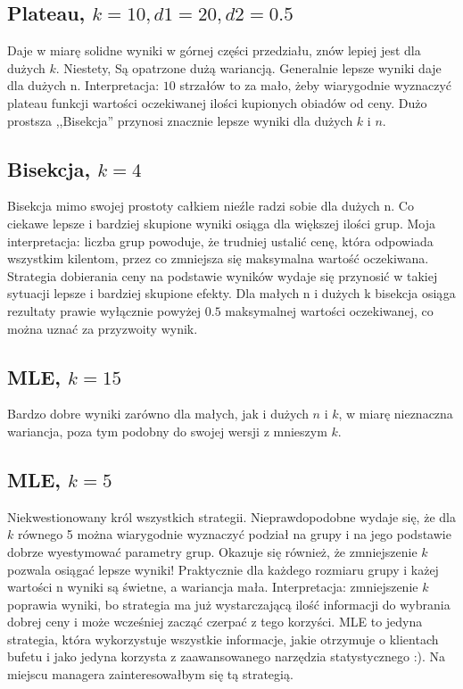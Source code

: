 \documentclass[a4paper,11pt]{article}
\begin{document}
\subsection{Plateau, $k=10, d1=20, d2=0.5$}
Daje w miarę solidne wyniki w górnej części przedziału, znów lepiej jest dla dużych $k$.
Niestety, Są opatrzone dużą wariancją. Generalnie lepsze wyniki daje dla dużych n.
Interpretacja: $10$ strzałów to za mało, żeby wiarygodnie wyznaczyć plateau funkcji
wartości oczekiwanej ilości kupionych obiadów od ceny. Dużo prostsza ,,Bisekcja''
przynosi znacznie lepsze wyniki dla dużych $k$ i $n$.

\subsection{Bisekcja, $k = 4$}
Bisekcja mimo swojej prostoty całkiem nieźle radzi sobie dla dużych n. Co ciekawe lepsze
i bardziej skupione wyniki osiąga dla większej ilości grup. Moja interpretacja:
liczba grup powoduje, że trudniej ustalić cenę, która odpowiada wszystkim kilentom,
przez co zmniejsza się maksymalna wartość oczekiwana. Strategia dobierania ceny
na podstawie wyników wydaje się przynosić w takiej sytuacji lepsze i bardziej skupione efekty.
Dla małych n i dużych k bisekcja osiąga rezultaty prawie wyłącznie powyżej $0.5$ maksymalnej
wartości oczekiwanej, co można uznać za przyzwoity wynik.

\subsection{MLE, $k = 15$}
Bardzo dobre wyniki zarówno dla małych, jak i dużych $n$ i $k$, w miarę nieznaczna wariancja,
poza tym podobny do swojej wersji z mnieszym $k$.

\subsection{MLE, $k = 5$}
Niekwestionowany król wszystkich strategii. Nieprawdopodobne wydaje się, że dla $k$ równego 5
można wiarygodnie wyznaczyć podział na grupy i na jego podstawie dobrze wyestymować parametry
grup. Okazuje się również, że zmniejszenie $k$ pozwala osiągać lepsze wyniki! Praktycznie
dla każdego rozmiaru grupy i każej wartości n wyniki są świetne, a wariancja mała. Interpretacja:
zmniejszenie $k$ poprawia wyniki, bo strategia ma już wystarczającą ilość informacji do wybrania
dobrej ceny i może wcześniej zacząć czerpać z tego korzyści. MLE to jedyna strategia, która wykorzystuje
wszystkie informacje, jakie otrzymuje o klientach bufetu i jako jedyna korzysta z
zaawansowanego narzędzia statystycznego :). Na miejscu managera zainteresowałbym się
tą strategią.
\end{document}
